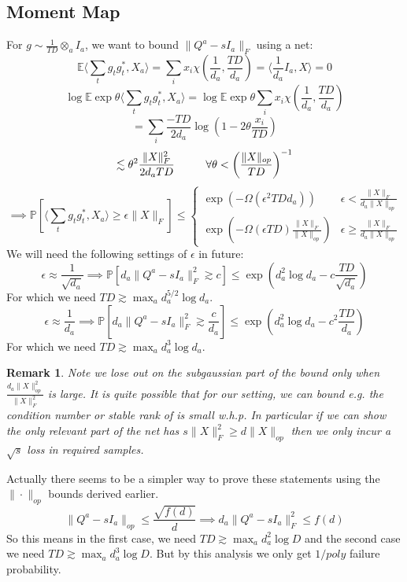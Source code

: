 \documentclass{article}
\newtheorem{remark}{Remark}
\newcommand{\E}{\mathbb{E}}
\renewcommand{\Pr}{\mathbb{P}}
\begin{document}
\subsection{Moment Map}
For $g \sim \frac{1}{TD} \otimes_{a} I_{a}$, we want to bound $\|Q^{a} - sI_{a}\|_{F}$ using a net:
\[ \E \langle \sum_{t} g_{t} g_{t}^{*}, X_{a} \rangle = \sum_{i} x_{i} \chi(\frac{1}{d_{a}}, \frac{TD}{d_{a}}) = \langle \frac{1}{d_{a}} I_{a}, X \rangle = 0 \]
\[ \log \E \exp \theta \langle \sum_{t} g_{t} g_{t}^{*}, X_{a} \rangle = \log \E \exp \theta \sum_{i} x_{i} \chi(\frac{1}{d_{a}}, \frac{TD}{d_{a}})  \]
\[ = \sum_{i} \frac{-TD}{2 d_{a}} \log \left( 1 - 2 \theta \frac{x_{i}}{TD} \right)   \]
\[ \lesssim \theta^{2} \frac{\|X\|_{F}^{2}}{2 d_{a} TD} \hspace{10mm} \forall \theta < \left( \frac{\|X\|_{op}}{TD} \right)^{-1}  \]
\[ \implies \Pr[ \langle \sum_{t} g_{t} g_{t}^{*}, X_{a} \rangle \geq \epsilon \|X\|_{F} ] \leq 
\begin{cases} 
\exp( - \Omega(\epsilon^{2} TD d_{a}) ) & \epsilon  < \frac{\|X\|_{F}}{d_{a} \|X\|_{op}} 
\\ \exp ( - \Omega(\epsilon TD) \frac{\|X\|_{F}}{\|X\|_{op}} ) & \epsilon \geq \frac{\|X\|_{F}}{d_{a} \|X\|_{op}}
\end{cases}
\]
We will need the following settings of $\epsilon$ in future:
\[ \epsilon \approx \frac{1}{\sqrt{d_{a}}} \implies \Pr [ d_{a} \|Q^{a} - sI_{a}\|_{F}^{2} \gtrsim c ] \leq \exp(d_{a}^{2} \log d_{a} - c \frac{TD}{\sqrt{d_{a}}})  \]
For which we need $TD \gtrsim \max_{a} d_{a}^{5/2} \log d_{a}$.
\[ \epsilon \approx \frac{1}{d_{a}} \implies \Pr [ d_{a} \|Q^{a} - sI_{a}\|_{F}^{2} \gtrsim \frac{c}{d_{a}} ] \leq \exp(d_{a}^{2} \log d_{a} - c^{2} \frac{TD}{d_{a}})   \]
For which we need $TD \gtrsim \max_{a} d_{a}^{3} \log d_{a}$.

\begin{remark}
Note we lose out on the subgaussian part of the bound only when $\frac{d_{a} \|X\|_{op}^{2}}{\|X\|_{F}^{2}}$ is large. It is quite possible that for our setting, we can bound e.g. the condition number or stable rank of is small w.h.p. In particular if we can show the only relevant part of the net has $s \|X\|_{F}^{2} \geq d \|X\|_{op}$ then we only incur a $\sqrt{s}$ loss in required samples. 
\end{remark}

Actually there seems to be a simpler way to prove these statements using the $\|\cdot\|_{op}$ bounds derived earlier. 
\[ \|Q^{a} - sI_{a}\|_{op} \leq \frac{\sqrt{f(d)}}{d} \implies d_{a} \|Q^{a} - sI_{a}\|_{F}^{2} \leq f(d)  \]
So this means in the first case, we need $TD \gtrsim \max_{a} d_{a}^{2} \log D$ and the second case we need $TD \gtrsim \max_{a} d_{a}^{3} \log D$. But by this analysis we only get $1/poly$ failure probability. 
\end{document}
